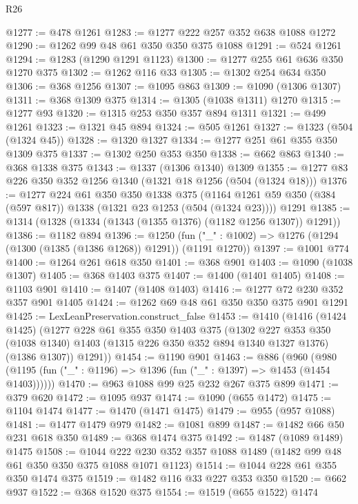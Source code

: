 \begin{lexlean}{R26}
\begin{coremodule}
{{{{{{{{{{{{{{{@1277 := @478 @1261
@1283 := @1277 @222 @257 @352 @638 @1088 @1272
@1290 := @1262 @99 @48 @61 @350 @350 @375 @1088
@1291 := @524 @1261
@1294 := @1283 (@1290 @1291 @1123)
@1300 := @1277 @255 @61 @636 @350 @1270 @375
@1302 := @1262 @116 @33
@1305 := @1302 @254 @634 @350
@1306 := @368 @1256
@1307 := @1095 @863
@1309 := @1090 (@1306 @1307)
@1311 := @368 @1309 @375
@1314 := @1305 (@1038 @1311) @1270
@1315 := @1277 @93
@1320 := @1315 @253 @350 @357 @894 @1311
@1321 := @499 @1261
@1323 := @1321 @45 @894
@1324 := @505 @1261
@1327 := @1323 (@504 (@1324 @45))
@1328 := @1320 @1327
@1334 := @1277 @251 @61 @355 @350 @1309 @375
@1337 := @1302 @250 @353 @350
@1338 := @662 @863
@1340 := @368 @1338 @375
@1343 := @1337 (@1306 @1340) @1309
@1355 := @1277 @83 @226 @350 @352 @1256 @1340 (@1321 @18 @1256 (@504 (@1324 @18)))
@1376 := @1277
    @224
    @61
    @350
    @350
    @1338
    @375
    (@1164 @1261 @59 @350 (@384 (@597 @817)) @1338 (@1321 @23 @1253 (@504 (@1324 @23))))
    @1291
@1385 := @1314 (@1328 (@1334 (@1343 (@1355 @1376) (@1182 @1256 @1307)) @1291))
@1386 := @1182 @894
@1396 := @1250
    (fun ("_" : @1002) => @1276 (@1294 (@1300 (@1385 (@1386 @1268)) @1291)) (@1191 @1270))
@1397 := @1001 @774
@1400 := @1264 @261 @618 @350
@1401 := @368 @901
@1403 := @1090 (@1038 @1307)
@1405 := @368 @1403 @375
@1407 := @1400 (@1401 @1405)
@1408 := @1103 @901
@1410 := @1407 (@1408 @1403)
@1416 := @1277 @72 @230 @352 @357 @901 @1405
@1424 := @1262 @69 @48 @61 @350 @350 @375 @901 @1291
@1425 := LexLeanPreservation.construct_false
@1453 := @1410
    (@1416
      (@1424 @1425)
      (@1277
        @228
        @61
        @355
        @350
        @1403
        @375
        (@1302
          @227
          @353
          @350
          (@1038 @1340)
          @1403
          (@1315 @226 @350 @352 @894 @1340 @1327 @1376)
          (@1386 @1307))
        @1291))
@1454 := @1190 @901
@1463 := @886
    (@960 (@980 (@1195 (fun ("_" : @1196) => @1396 (fun ("_" : @1397) => @1453 (@1454 @1403))))))
@1470 := @963 @1088 @99 @25 @232 @267 @375 @899
@1471 := @379 @620
@1472 := @1095 @937
@1474 := @1090 (@655 @1472)
@1475 := @1104 @1474
@1477 := @1470 (@1471 @1475)
@1479 := @955 (@957 @1088)
@1481 := @1477 @1479 @979
@1482 := @1081 @899
@1487 := @1482 @66 @50 @231 @618 @350
@1489 := @368 @1474 @375
@1492 := @1487 (@1089 @1489) @1475
@1508 := @1044 @222 @230 @352 @357 @1088 @1489 (@1482 @99 @48 @61 @350 @350 @375 @1088 @1071 @1123)
@1514 := @1044 @228 @61 @355 @350 @1474 @375
@1519 := @1482 @116 @33 @227 @353 @350
@1520 := @662 @937
@1522 := @368 @1520 @375
@1554 := @1519
    (@655 @1522)
    @1474
}}}}}}}}}}}}}}}
\end{coremodule}
\end{lexlean}
